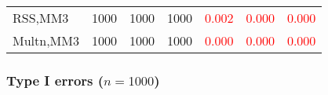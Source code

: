 \documentclass[
]{article}
\begin{document}
\begin{table}[H]
{\begin{tabular}[t]{lrrrrrr}
\hspace{1em}RSS,MM3 & 1000 & 1000 & 1000 & \textcolor{red}{0.002} & \textcolor{red}{0.000} & \textcolor{red}{0.000}\\
\hspace{1em}Multn,MM3 & 1000 & 1000 & 1000 & \textcolor{red}{0.000} & \textcolor{red}{0.000} & \textcolor{red}{0.000}\\
\bottomrule
\end{tabular}}
\endgroup{}
\end{table}

\hypertarget{type-i-errors-n1000-2}{%
\subsubsection{\texorpdfstring{Type I errors
(\(n=1000\))}{Type I errors (n=1000)}}\label{type-i-errors-n1000-2}}
\end{document}
